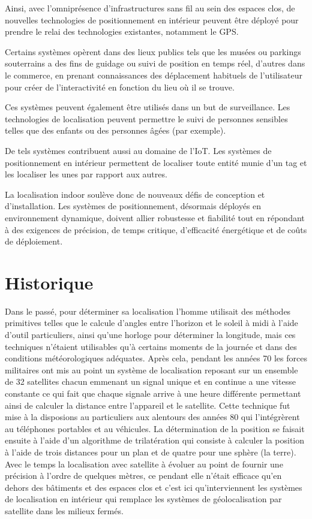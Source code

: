 \documentclass[12pt,a4paper]{report}
\begin{document}
Ainsi, avec l’omniprésence d’infrastructures sans fil au sein des espaces clos, de nouvelles technologies de positionnement en intérieur peuvent être déployé pour prendre le relai des technologies existantes, notamment le GPS.

Certains systèmes opèrent dans des lieux publics tels que les musées ou parkings souterrains a des fins de guidage ou suivi de position en temps réel, d’autres dans le commerce, en prenant connaissances des déplacement habituels de l’utilisateur pour créer de l’interactivité en fonction du lieu où il se trouve.

Ces systèmes peuvent également être utilisés dans un but de surveillance. Les technologies de localisation peuvent permettre le suivi de personnes sensibles telles que des enfants ou des personnes âgées (par exemple).

De tels systèmes contribuent aussi au domaine de l’IoT. Les systèmes de positionnement en intérieur permettent de localiser toute entité munie d’un tag et les localiser les unes par rapport aux autres.


La localisation indoor soulève donc de nouveaux défis de conception et d’installation. Les systèmes de positionnement, désormais déployés en environnement dynamique, doivent allier robustesse et fiabilité tout en répondant à des exigences de précision, de temps critique, d’efficacité énergétique et de coûts de déploiement.

\section{Historique}

Dans le passé, pour déterminer sa localisation l'homme utilisait des méthodes primitives telles que le calcule d'angles entre l'horizon et le soleil à midi à l'aide d'outil particuliers, ainsi qu'une horloge pour déterminer la longitude, mais ces techniques n'étaient utilisables qu'à certains moments de la journée et dans des conditions météorologiques adéquates. Après cela, pendant les années 70 les forces militaires ont mis au point un système de localisation reposant sur un ensemble de 32 satellites chacun emmenant un signal unique et en continue a une vitesse constante ce qui fait que chaque signale arrive à une heure différente permettant ainsi de calculer la distance entre l'appareil et le satellite. Cette technique fut mise à la disposions au particuliers aux alentours des années 80 qui l'intégrèrent au téléphones portables et au véhicules. La détermination de la position se faisait ensuite à l'aide d'un algorithme de trilatération qui consiste à calculer la position à l'aide de trois distances pour un plan et de quatre pour une sphère (la terre). Avec le temps la localisation avec satellite à évoluer au point de fournir une précision à l'ordre de quelques mètres, ce pendant elle n'était efficace qu'en dehors des bâtiments et des espaces clos et c'est ici qu'interviennent les systèmes de localisation en intérieur qui remplace les systèmes de géolocalisation par satellite dans les milieux fermés.
\end{document}
